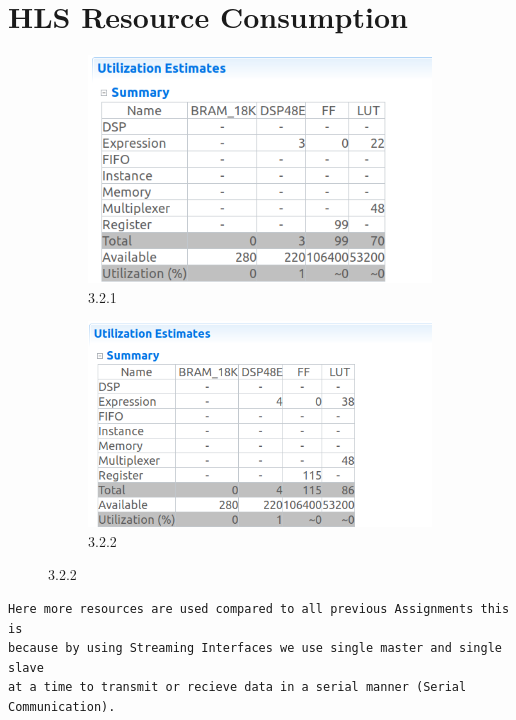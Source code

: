 \documentclass{article}
\begin{document}
\section{HLS Resource Consumption}
\vspace{1cm}
\begin{figure}[h]
\centering
\begin{subfigure}[b]{0.8\textwidth}
    \centering
\includegraphics[width=\textwidth]{figs/31a.png}
    \caption{3.2.1}
    \label{fig:my_label}
\end{subfigure}
\hfill
\begin{subfigure}[b]{0.8\textwidth}
    \centering
\includegraphics[width=\textwidth]{figs/31b.png}
    \caption{3.2.2}
    \label{fig:my_label}
\end{subfigure}
\end{figure}
\begin{lstlisting}
Here more resources are used compared to all previous Assignments this is
because by using Streaming Interfaces we use single master and single slave 
at a time to transmit or recieve data in a serial manner (Serial
Communication).
\end{lstlisting}
\vspace{5cm}
\end{document}
